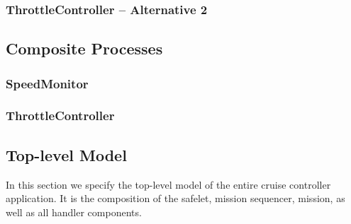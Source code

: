 \documentclass{article}
\begin{document}
\begin{circusbox}

\end{circusbox}

\newpage

\subsubsection{ThrottleController -- Alternative 2}

\begin{circusbox}

\end{circusbox}

\newpage

\subsection{Composite Processes}

\subsubsection{SpeedMonitor}

\begin{circusbox}

\end{circusbox}

\subsubsection{ThrottleController}

\begin{circusbox}

\end{circusbox}

\newpage

\subsection{Top-level Model}

In this section we specify the top-level model of the entire cruise controller application. It is the composition of the safelet, mission sequencer, mission, as well as all handler components.

\begin{circusbox}

\end{circusbox}

\newpage

\end{document}
